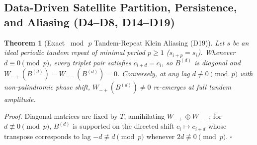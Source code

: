 \documentclass[11pt,a4paper]{article}
\newtheorem{theorem}{Theorem}
\newcommand{\Wmp}{W_{-+}}
\newcommand{\Wmm}{W_{--}}
\begin{document}
\subsection{Data-Driven Satellite Partition, Persistence, and Aliasing (D4--D8, D14--D19)}
\begin{theorem}[Exact $\bmod\,p$ Tandem-Repeat Klein Aliasing (D19)]
\label{thm:aliasing}
Let $s$ be an ideal periodic tandem repeat of minimal period $p\ge 1$ ($s_{i+p}=s_i$). Whenever $d \equiv 0 \pmod p$, every triplet pair satisfies $c_{i+d}=c_i$, so $B^{(d)}$ is diagonal and $\Wmp(B^{(d)}) = \Wmm(B^{(d)}) = 0$. Conversely, at any lag $d \not\equiv 0 \pmod p$ with non-palindromic phase shift, $\Wmp(B^{(d)}) \neq 0$ re-emerges at full tandem amplitude.
\end{theorem}
\noindent\textit{Proof.} Diagonal matrices are fixed by $T$, annihilating $\Wmp \oplus \Wmm$; for $d \not\equiv 0 \pmod p$, $B^{(d)}$ is supported on the directed shift $c_i \mapsto c_{i+d}$ whose transpose corresponds to lag $-d \not\equiv d \pmod p$ whenever $2d \not\equiv 0 \pmod p$. $\square$
\end{document}
